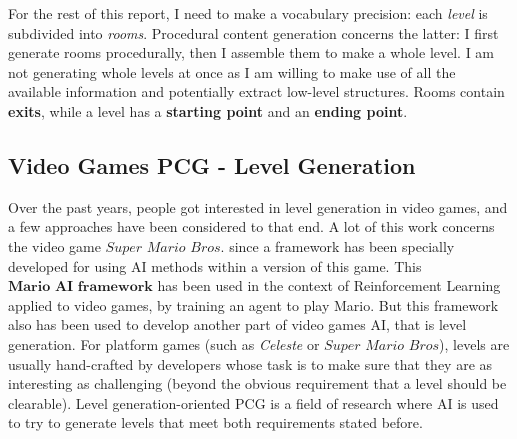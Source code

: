 \documentclass{article}
\newcommand{\Celeste}{\textit{Celeste} }
\begin{document}
\noindent For the rest of this report, I need to make a vocabulary precision: each \textit{level} is subdivided into \textit{rooms}. Procedural content generation concerns the latter: I first generate rooms procedurally, then I assemble them to make a whole level. I am not generating whole levels at once as I am willing to make use of all the available information and potentially extract low-level structures. Rooms contain \textbf{exits}, while a level has a \textbf{starting point} and an \textbf{ending point}.
\vspace{0.25cm}

\subsection{Video Games PCG - Level Generation}
Over the past years, people got interested in level generation in video games, and a few approaches have been considered to that end. A lot of this work concerns the video game $\textit{Super Mario Bros.}$ since a framework has been specially developed for using AI methods within a version of this game. This $\textbf{Mario AI framework}$ has been used in the context of Reinforcement Learning applied to video games, by training an agent to play Mario. But this framework also has been used to develop another part of video games AI, that is level generation. For platform games (such as \Celeste or $\textit{Super Mario Bros}$), levels are usually hand-crafted by developers whose task is to make sure that they are as interesting as challenging (beyond the obvious requirement that a level should be clearable). Level generation-oriented PCG is a field of research where AI is used to try to generate levels that meet both requirements stated before.
\end{document}
